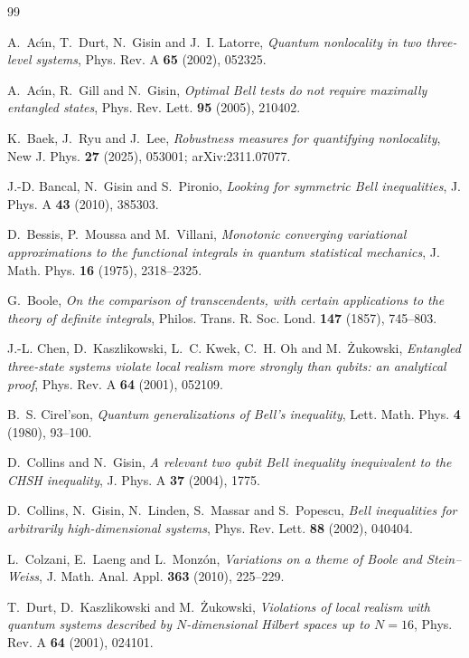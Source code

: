 \documentclass[11pt]{amsart}
\theoremstyle{definition}
\theoremstyle{remark}
\numberwithin{equation}{section}
\begin{document}
\raggedbottom
\begin{thebibliography}{99}

A.~Ac\'{\i}n, T.~Durt, N.~Gisin and J.~I. Latorre, \emph{Quantum nonlocality in two three-level systems}, Phys. Rev. A
\textbf{65} (2002), 052325.

A.~Ac\'{\i}n, R.~Gill and N.~Gisin, \emph{Optimal Bell tests do not require maximally entangled states}, Phys. Rev.
Lett. \textbf{95} (2005), 210402.

K.~Baek, J.~Ryu and J.~Lee, \emph{Robustness measures for quantifying nonlocality}, New J. Phys. \textbf{27} (2025),
053001; arXiv:2311.07077.

J.-D. Bancal, N.~Gisin and S.~Pironio, \emph{Looking for symmetric Bell inequalities}, J. Phys. A \textbf{43} (2010),
385303.

D.~Bessis, P.~Moussa and M.~Villani, \emph{Monotonic converging variational approximations to the functional integrals
in quantum statistical mechanics}, J. Math. Phys. \textbf{16} (1975), 2318--2325.

G.~Boole, \emph{On the comparison of transcendents, with certain applications to the theory of definite integrals},
Philos. Trans. R. Soc. Lond. \textbf{147} (1857), 745--803.

J.-L. Chen, D.~Kaszlikowski, L.~C. Kwek, C.~H. Oh and M.~\.Zukowski, \emph{Entangled three-state systems violate local
realism more strongly than qubits: an analytical proof}, Phys. Rev. A \textbf{64} (2001), 052109.

B.~S. Cirel'son, \emph{Quantum generalizations of Bell's inequality}, Lett. Math. Phys. \textbf{4} (1980), 93--100.

D.~Collins and N.~Gisin, \emph{A relevant two qubit Bell inequality inequivalent to the CHSH inequality}, J. Phys. A
\textbf{37} (2004), 1775.

D.~Collins, N.~Gisin, N.~Linden, S.~Massar and S.~Popescu, \emph{Bell inequalities for arbitrarily high-dimensional
systems}, Phys. Rev. Lett. \textbf{88} (2002), 040404.

L.~Colzani, E.~Laeng and L.~Monz\'on, \emph{Variations on a theme of Boole and Stein--Weiss}, J. Math. Anal. Appl.
\textbf{363} (2010), 225--229.

T.~Durt, D.~Kaszlikowski and M.~\.Zukowski, \emph{Violations of local realism with quantum systems described by
$N$-dimensional Hilbert spaces up to $N=16$}, Phys. Rev. A \textbf{64} (2001), 024101.


\end{thebibliography}
\end{document}
